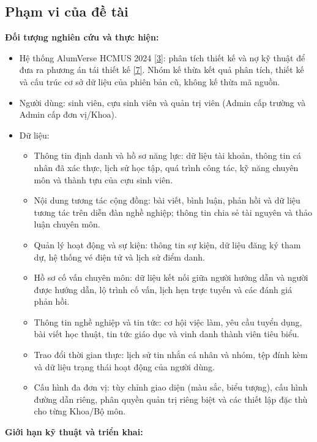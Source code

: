\documentclass[12pt,a4paper]{article}
\begin{document}
\subsection{Phạm vi của đề tài}
\vspace{-4pt}
\textbf{Đối tượng nghiên cứu và thực hiện:}
\vspace{-4pt}
\begin{itemize}
    \item Hệ thống AlumVerse HCMUS 2024 \hyperref[ref:alumverse]{[3]}: phân tích thiết kế và nợ kỹ thuật để đưa ra phương án tái thiết kế \hyperref[ref:fowler]{[7]}. Nhóm kế thừa kết quả phân tích, thiết kế và cấu trúc cơ sở dữ liệu của phiên bản cũ, không kế thừa mã nguồn.
    \item Người dùng: sinh viên, cựu sinh viên và quản trị viên (Admin cấp trường và Admin cấp đơn vị/Khoa).
    \item Dữ liệu:
    \begin{itemize}
        \item Thông tin định danh và hồ sơ năng lực: dữ liệu tài khoản, thông tin cá nhân đã xác thực, lịch sử học tập, quá trình công tác, kỹ năng chuyên môn và thành tựu của cựu sinh viên.
        \item Nội dung tương tác cộng đồng: bài viết, bình luận, phản hồi và dữ liệu tương tác trên diễn đàn nghề nghiệp; thông tin chia sẻ tài nguyên và thảo luận chuyên môn.
        \item Quản lý hoạt động và sự kiện: thông tin sự kiện, dữ liệu đăng ký tham dự, hệ thống vé điện tử và lịch sử điểm danh.
        \item Hồ sơ cố vấn chuyên môn: dữ liệu kết nối giữa người hướng dẫn và người được hướng dẫn, lộ trình cố vấn, lịch hẹn trực tuyến và các đánh giá phản hồi.
        \item Thông tin nghề nghiệp và tin tức: cơ hội việc làm, yêu cầu tuyển dụng, bài viết học thuật, tin tức giáo dục và vinh danh thành viên tiêu biểu.
        \item Trao đổi thời gian thực: lịch sử tin nhắn cá nhân và nhóm, tệp đính kèm và dữ liệu trạng thái hoạt động của người dùng.
        \item Cấu hình đa đơn vị: tùy chỉnh giao diện (màu sắc, biểu tượng), cấu hình đường dẫn riêng, phân quyền quản trị riêng biệt và các thiết lập đặc thù cho từng Khoa/Bộ môn.
    \end{itemize}
\end{itemize}
\textbf{Giới hạn kỹ thuật và triển khai:}
\vspace{-4pt}
\end{document}
